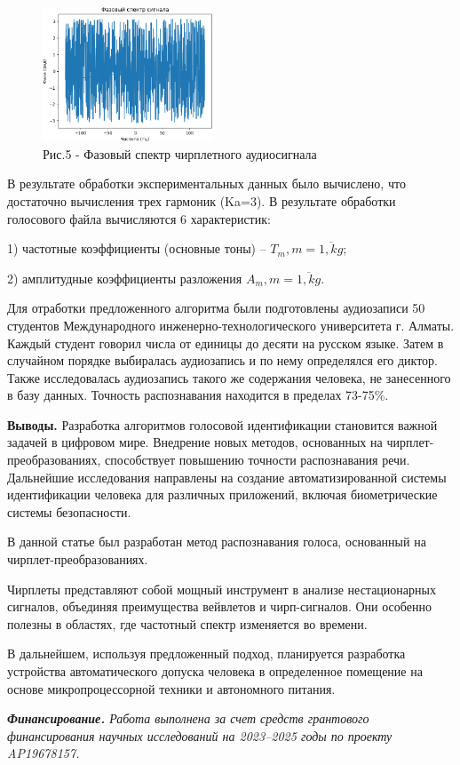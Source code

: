 \begin{figure}[H]
   \centering
   \includegraphics[width=0.45\textwidth]{media/ict/image68}
   \caption*{Рис.5 - Фазовый спектр чирплетного аудиосигнала}
\end{figure}

\begin{multicols}{2}
В результате обработки экспериментальных данных было вычислено, что
достаточно вычисления трех гармоник (Ka=3). В результате обработки
голосового файла вычисляются 6 характеристик:

1) частотные коэффициенты (основные тоны) -- $T_m,m=\overline{1,kg}$;

2) амплитудные коэффициенты разложения $A_m,m=\overline{1,kg}$.

Для отработки предложенного алгоритма были подготовлены аудиозаписи 50
студентов Международного инженерно-технологического университета г.
Алматы. Каждый студент говорил числа от единицы до десяти на русском
языке. Затем в случайном порядке выбиралась аудиозапись и по нему
определялся его диктор. Также исследовалась аудиозапись такого же
содержания человека, не занесенного в базу данных. Точность
распознавания находится в пределах 73-75\%.

{\bfseries Выводы.} Разработка алгоритмов голосовой идентификации
становится важной задачей в цифровом мире. Внедрение новых методов,
основанных на чирплет-преобразованиях, способствует повышению точности
распознавания речи. Дальнейшие исследования направлены на создание
автоматизированной системы идентификации человека для различных
приложений, включая биометрические системы безопасности.

В данной статье был разработан метод распознавания голоса, основанный на
чирплет-преобразованиях.

Чирплеты представляют собой мощный инструмент в анализе нестационарных
сигналов, объединяя преимущества вейвлетов и чирп-сигналов. Они особенно
полезны в областях, где частотный спектр изменяется во времени.

В дальнейшем, используя предложенный подход, планируется разработка
устройства автоматического допуска человека в определенное помещение на
основе микропроцессорной техники и автономного питания.

\emph{{\bfseries Финансирование.} Работа выполнена за счет средств
грантового финансирования научных исследований на 2023--2025 годы по
проекту AP19678157.}
\end{multicols}

